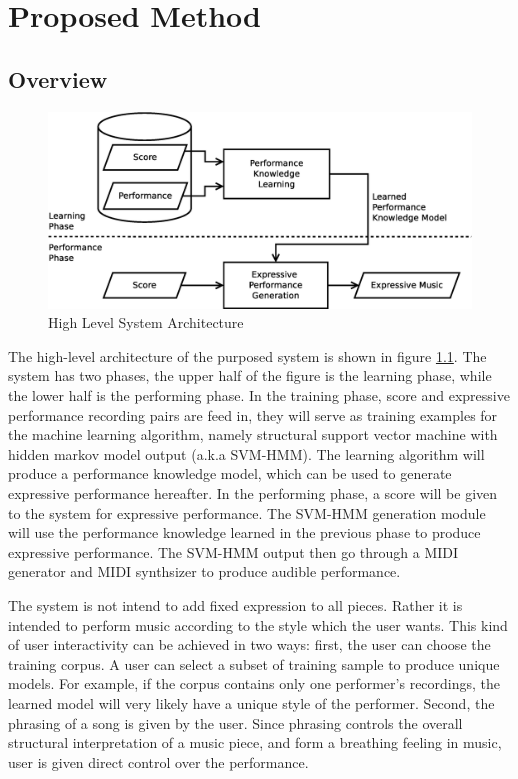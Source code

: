 \chapter{Proposed Method}
\section{Overview}
      \begin{figure}[tp]
         \begin{center}
            \includegraphics[width=\textwidth]{fig/high_lev_arch}
         \end{center}
         \caption{High Level System Architecture} 
         \label{fig:flow}
      \end{figure}
The high-level architecture of the purposed system is shown in figure \ref{fig:flow}. The system has two phases, the upper half of the figure is the learning phase, while the lower half is the performing phase.  In the training phase, score and expressive performance recording pairs are feed in, they will serve as training examples for the machine learning algorithm, namely structural support vector machine with hidden markov model output (a.k.a SVM-HMM). The learning algorithm will produce a performance knowledge model, which can be used to generate expressive performance hereafter. In the performing phase, a score will be given to the system for expressive performance. The SVM-HMM generation module will use the performance knowledge learned in the previous phase to produce expressive performance. The SVM-HMM output then go through a MIDI generator and MIDI synthsizer to produce audible performance.

The system is not intend to add fixed expression to all pieces. Rather it is intended to perform music according to the style which the user wants. This kind of user interactivity can be achieved in two ways: first, the user can choose the training corpus. A user can select a subset of training sample to produce unique models. For example, if the corpus contains only one performer's recordings, the learned model will very likely have a unique style of the performer. Second, the phrasing of a song is given by the user. Since phrasing controls the overall structural interpretation of a music piece, and form a breathing feeling in music, user is given direct control over the performance.

